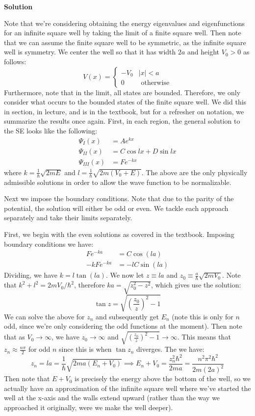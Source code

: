 \documentclass[12pt]{article}
\newcounter{AnswerCounter}
\newcounter{SubAnswerCounter}
\newenvironment{answer}[0]{
  \setcounter{SubAnswerCounter}{1}
  \bigskip
  \textbf{Solution \arabic{AnswerCounter}}
  \\
  \begin{small}
}{
  \end{small}
  \stepcounter{AnswerCounter}
}
\begin{document}
\begin{answer}
Note that we're considering obtaining the energy eigenvalues and eigenfunctions for an infinite square well by taking the limit of a finite square well. Then note that we can assume the finite square well to be symmetric, as the infinite square well is symmetry. We center the well so that it has width $2a$ and height $V_0 > 0$ as follows:
$$
V(x) = \begin{cases}
-V_0 & |x| < a \\
0 & \text{ otherwise}
\end{cases}
$$
Furthermore, note that in the limit, all states are bounded. Therefore, we only consider what occurs to the bounded states of the finite square well. We did this in section, in lecture, and is in the textbook, but for a refresher on notation, we summarize the results once again. First, in each region, the general solution to the SE looks like the following:
\begin{align*}
\Psi_I(x) &= Ae^{kx} \tag{Region I} \\
\Psi_{II}(x)&= C\cos lx + D \sin lx \tag{Region II} \\
\Psi_{III}(x) &= Fe^{-kx} \tag{Region III}
\end{align*}
where $k = \frac{1}{\hbar}\sqrt{2mE}$ and $l = \frac{1}{\hbar}\sqrt{2m(V_0 + E)}$. The above are the only physically admissible solutions in order to allow the wave function to be normalizable.

Next we impose the boundary conditions. Note that due to the parity of the potential, the solution will either be odd or even. We tackle each approach separately and take their limits separately.

First, we begin with the even solutions as covered in the textbook. Imposing boundary conditions we have:
\begin{align*}
Fe^{-ka} &= C \cos(la) \tag{$\Psi$ continuous at $x=a$} \\
-kFe^{-ka} &= -lC \sin(la) \tag{$\Psi'$ continuous at $x = a$}
\end{align*}
Dividing, we have $k = l \tan(la)$.
We now let $z \equiv la$ and $z_0 \equiv \frac{a}{\hbar}\sqrt{2mV_0}$. Note that $k^2 + l^2 = 2mV_0/\hbar^2$, therefore $ka = \sqrt{z_0^2 - z^2}$, which gives use the solution:
$$
\tan z = \sqrt{\left(\frac{z_0}{z}\right)^2 - 1}
$$
We can solve the above for $z_n$ and subsequently get $E_n$ (note this is only for $n$ odd, since we're only considering the odd functions at the moment). Then note that as $V_0 \to \infty$, we have $z_0 \to \infty$ and $\sqrt{\left(\frac{z_0}{z}\right)^2 - 1} \to \infty$. This means that $z_n \approx \frac{n\pi}{2}$ for odd $n$ since this is when $\tan z_n$ diverges. The we have:
$$
z_n = la = \frac{1}{\hbar} \sqrt{2ma(E_n+V_0)}\implies E_n + V_0 = \frac{z_n^2\hbar^2}{2ma} = \frac{n^2\pi^2\hbar^2}{2m(2a)^2}
$$
Then note that $E + V_0$ is precisely the energy above the bottom of the well, so we actually have an approximation of the infinite square well where we've started the well at the x-axis and the walls extend upward (rather than the way we approached it originally, were we make the well deeper).


\end{answer}
\end{document}

